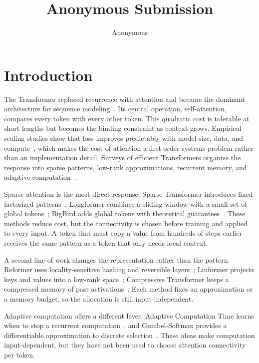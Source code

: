 \documentclass[10pt]{article}
\title{Anonymous Submission}
\author{Anonymous}
\date{}
\begin{document}
\maketitle

\begin{abstract}
\end{abstract}


\section{Introduction}
\label{sec:intro}
The Transformer replaced recurrence with attention and became the dominant architecture for sequence modeling~\cite{Vaswani2017Attention}. Its central operation, self-attention, compares every token with every other token. This quadratic cost is tolerable at short lengths but becomes the binding constraint as context grows. Empirical scaling studies show that loss improves predictably with model size, data, and compute~\cite{Kaplan2020Scaling}, which makes the cost of attention a first-order systems problem rather than an implementation detail. Surveys of efficient Transformers organize the response into sparse patterns, low-rank approximations, recurrent memory, and adaptive computation~\cite{Tay2022Efficient}.

Sparse attention is the most direct response. Sparse Transformer introduces fixed factorized patterns~\cite{Child2019Generating}; Longformer combines a sliding window with a small set of global tokens~\cite{Beltagy2020Longformer}; BigBird adds global tokens with theoretical guarantees~\cite{Zaheer2020Big}. These methods reduce cost, but the connectivity is chosen before training and applied to every input. A token that must copy a value from hundreds of steps earlier receives the same pattern as a token that only needs local context.

A second line of work changes the representation rather than the pattern. Reformer uses locality-sensitive hashing and reversible layers~\cite{Kitaev2020Reformer}; Linformer projects keys and values into a low-rank space~\cite{Wang2020Linformer}; Compressive Transformer keeps a compressed memory of past activations~\cite{Rae2020Compressive}. Each method fixes an approximation or a memory budget, so the allocation is still input-independent.

Adaptive computation offers a different lever. Adaptive Computation Time learns when to stop a recurrent computation~\cite{Graves2016Adaptive}, and Gumbel-Softmax provides a differentiable approximation to discrete selection~\cite{Jang2017Categorical}. These ideas make computation input-dependent, but they have not been used to choose attention connectivity per token.
\end{document}
